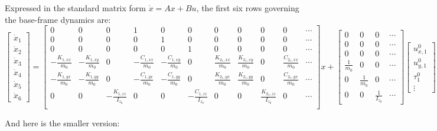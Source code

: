 \documentclass[12pt,letterpaper]{report}
\begin{document}
Expressed in the standard matrix form $\dot{x} = Ax + Bu$, the first six rows governing the base-frame dynamics are:
\setcounter{MaxMatrixCols}{20}
\begin{equation}
\begin{bmatrix}\dot{x}_1\\\dot{x}_2\\\dot{x}_3\\\dot{x}_4\\\dot{x}_5\\\dot{x}_6\end{bmatrix}
=
\begin{bmatrix}
    0 & 0 & 0 & 1 & 0 & 0 & 0 & 0 & 0 & 0 & \cdots \\
    0 & 0 & 0 & 0 & 1 & 0 & 0 & 0 & 0 & 0 & \cdots \\
    0 & 0 & 0 & 0 & 0 & 1 & 0 & 0 & 0 & 0 & \cdots \\
    -\frac{K_{1,xx}}{m_0} & -\frac{K_{1,xy}}{m_0} & 0 & -\frac{C_{1,xx}}{m_0} & -\frac{C_{1,xy}}{m_0} & 0 & \frac{K_{2_1,xx}}{m_0} & \frac{K_{2_1,xy}}{m_0} & 0 & \frac{C_{2_1,xx}}{m_0} & \cdots \\
    -\frac{K_{1,yx}}{m_0} & -\frac{K_{1,yy}}{m_0} & 0 & -\frac{C_{1,yx}}{m_0} & -\frac{C_{1,yy}}{m_0} & 0 & \frac{K_{2_1,yx}}{m_0} & \frac{K_{2_1,yy}}{m_0} & 0 & \frac{C_{2_1,yx}}{m_0} & \cdots \\
    0 & 0 & -\frac{K_{1,zz}}{I_{z_0}} & 0 & 0 & -\frac{C_{1,zz}}{I_{z_0}} & 0 & 0 & \frac{K_{2_1,zz}}{I_{z_0}} & 0 & \cdots \\
\end{bmatrix}
x
+
\begin{bmatrix}
    0 & 0 & 0 & \cdots \\
    0 & 0 & 0 & \cdots \\
    0 & 0 & 0 & \cdots \\
    \frac{1}{m_0} & 0 & 0 & \cdots \\
    0 & \frac{1}{m_0} & 0 & \cdots \\
    0 & 0 & \frac{1}{I_{z_0}} & \cdots
\end{bmatrix}
\begin{bmatrix}u^0_{x,1}\\u^0_{y,1}\\\tau^0_1\\\vdots\end{bmatrix}
\end{equation}

And here is the smaller version:
\end{document}
